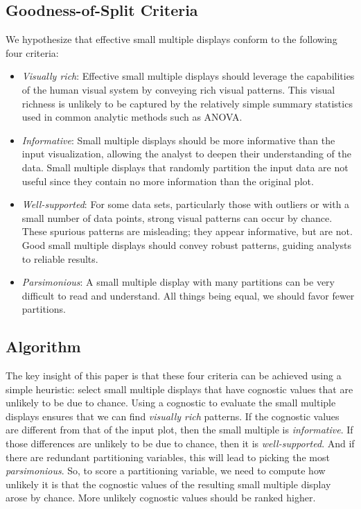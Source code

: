 \subsection{Goodness-of-Split Criteria}
We hypothesize that effective small multiple displays conform to the following four criteria:
\begin{itemize}
\item \emph{Visually rich}: Effective small multiple displays should leverage the capabilities of the human visual system by conveying rich visual patterns. This visual richness is unlikely to be captured by the relatively simple summary statistics used in common analytic methods such as ANOVA.

\item \emph{Informative}: Small multiple displays should be more informative than the input visualization, allowing the analyst to deepen their understanding of the data. Small multiple displays that randomly partition the input data are not useful since they contain no more information than the original plot.

\item \emph{Well-supported}: For some data sets, particularly those with outliers or with a small number of data points, strong visual patterns can occur by chance. These spurious patterns are misleading; they appear informative, but are not. Good small multiple displays should convey robust patterns, guiding analysts to reliable results.

\item \emph{Parsimonious}: A small multiple display with many partitions can be very difficult to read and understand. All things being equal, we should favor fewer partitions.
\end{itemize}

\subsection{Algorithm}

The key insight of this paper is that these four criteria can be achieved using a simple heuristic: select small multiple displays that have cognostic values that are unlikely to be due to chance. Using a cognostic to evaluate the small multiple displays ensures that we can find \emph{visually rich} patterns. If the cognostic values are different from that of the input plot, then the small multiple is \emph{informative}. If those differences are unlikely to be due to chance, then it is \emph{well-supported}. And if there are redundant partitioning variables, this will lead to picking the most \emph{parsimonious}. 
So, to score a partitioning variable, we need to compute how unlikely it is that the cognostic values of the resulting small multiple display arose by chance. More unlikely cognostic values should be ranked higher.

